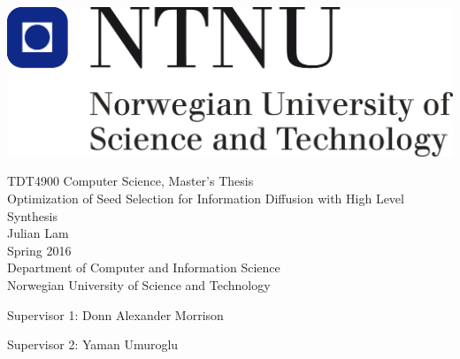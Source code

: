 \thispagestyle{empty}
\includegraphics[scale=0.3]{Figures/ntnu}
\mbox{}\\[6pc]
\begin{center}
\Large{TDT4900  Computer Science, Master's Thesis}\\[1pc]
\Huge{Optimization of Seed Selection for Information Diffusion with High Level Synthesis}\\[2pc]

\Large{Julian Lam}\\[1pc]
\large{Spring 2016}\\[2pc]


Department of Computer and Information Science\\
Norwegian University of Science and Technology
\end{center}
\vfill

\noindent Supervisor 1: Donn Alexander Morrison

\noindent Supervisor 2: Yaman Umuroglu